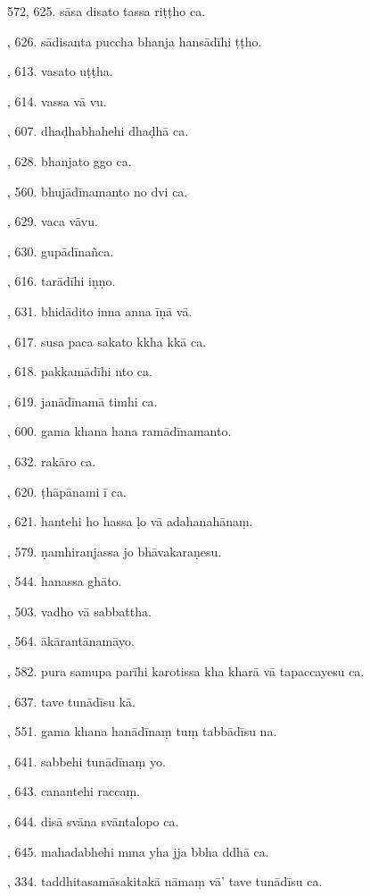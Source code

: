 572, 625. sāsa disato tassa riṭṭho ca.\par {}, 626. sādisanta puccha bhanja hansādīhi ṭṭho.\par {}, 613. vasato uṭṭha.\par {}, 614. vassa vā vu.\par {}, 607. dhaḍhabhahehi dhaḍhā ca.\par {}, 628. bhanjato ggo ca.\par {}, 560. bhujādīnamanto no dvi ca.\par {}, 629. vaca vāvu.\par {}, 630. gupādīnañca.\par {}, 616. tarādīhi iṇṇo.\par {}, 631. bhidādito inna anna īṇā vā.\par {}, 617. susa paca sakato kkha kkā ca.\par {}, 618. pakkamādīhi nto ca.\par {}, 619. janādīnamā timhi ca.\par {}, 600. gama khana hana ramādīnamanto.\par {}, 632. rakāro ca.\par {}, 620. ṭhāpānami ī ca.\par {}, 621. hantehi ho hassa ḷo vā adahanahānaṃ.\par {}, 579. ṇamhiranjassa jo bhāvakaraṇesu.\par {}, 544. hanassa ghāto.\par {}, 503. vadho vā sabbattha.\par {}, 564. ākārantānamāyo.\par {}, 582. pura samupa parīhi karotissa kha kharā vā tapaccayesu ca.\par {}, 637. tave tunādīsu kā.\par {}, 551. gama khana hanādīnaṃ tuṃ tabbādīsu na.\par {}, 641. sabbehi tunādīnaṃ yo.\par {}, 643. canantehi raccaṃ.\par {}, 644. disā svāna svāntalopo ca.\par {}, 645. mahadabhehi mma yha jja bbha ddhā ca.\par {}, 334. taddhitasamāsakitakā nāmaṃ vā’ tave tunādīsu ca.\par \noindent
